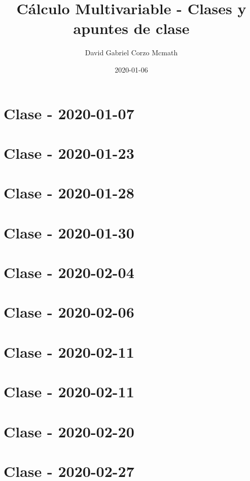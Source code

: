 \documentclass{book}
\title{Cálculo Multivariable - Clases y apuntes de clase}
\date{2020-01-06}
\author{David Gabriel Corzo Mcmath}
\begin{document}
\maketitle
\tableofcontents

\tikzblockdefinitions

\chapter{Clase - 2020-01-07}


\chapter{Clase - 2020-01-23}


\chapter{Clase - 2020-01-28}


\chapter{Clase - 2020-01-30}


\chapter{Clase - 2020-02-04}


\chapter{Clase - 2020-02-06}


\chapter{Clase - 2020-02-11}


\chapter{Clase - 2020-02-11}


\chapter{Clase - 2020-02-20}


\chapter{Clase - 2020-02-27}

\end{document}
